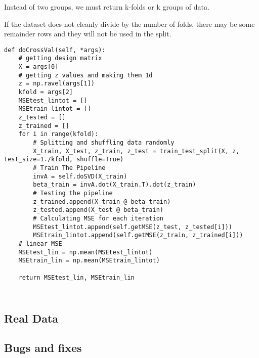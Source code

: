 Instead of two groups, we must return k-folds or k groups of data.

If the dataset does not cleanly divide by the number of folds, there may be some remainder rows and they will not be used in the split.
\begin{lstlisting}
def doCrossVal(self, *args):
    # getting design matrix
    X = args[0]
    # getting z values and making them 1d
    z = np.ravel(args[1])
    kfold = args[2]
    MSEtest_lintot = []
    MSEtrain_lintot = []
    z_tested = []
    z_trained = []
    for i in range(kfold):
        # Splitting and shuffling data randomly
        X_train, X_test, z_train, z_test = train_test_split(X, z, test_size=1./kfold, shuffle=True)
        # Train The Pipeline
        invA = self.doSVD(X_train)
        beta_train = invA.dot(X_train.T).dot(z_train)
        # Testing the pipeline
        z_trained.append(X_train @ beta_train)
        z_tested.append(X_test @ beta_train)
        # Calculating MSE for each iteration
        MSEtest_lintot.append(self.getMSE(z_test, z_tested[i]))
        MSEtrain_lintot.append(self.getMSE(z_train, z_trained[i]))
    # linear MSE
    MSEtest_lin = np.mean(MSEtest_lintot)
    MSEtrain_lin = np.mean(MSEtrain_lintot)

    return MSEtest_lin, MSEtrain_lin
\end{lstlisting}

\begin{lstlisting}

\end{lstlisting}
\begin{lstlisting}

\end{lstlisting}

\subsection{Real Data}


\subsection{Bugs and fixes}




